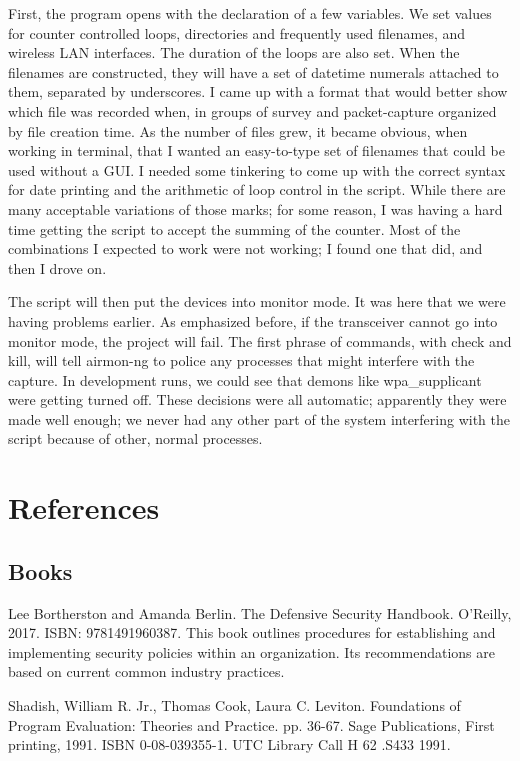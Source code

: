 First, the program opens with the declaration of a few variables.  We set values for counter controlled loops, directories and frequently used filenames, and wireless LAN interfaces.  The duration of the loops are also set.  When the filenames are constructed, they will have a set of datetime numerals attached to them, separated by underscores.  I came up with a format that would better show which file was recorded when, in groups of survey and packet-capture organized by file creation time.  As the number of files grew, it became obvious, when working in terminal, that I wanted an easy-to-type set of filenames that could be used without a GUI.  I needed some tinkering to come up with the correct syntax for date printing and the arithmetic of loop control in the script.  While there are many acceptable variations of those marks; for some reason, I was having a hard time getting the script to accept the summing of the counter.  Most of the combinations I expected to work were not working; I found one that did, and then I drove on.

The script will then put the devices into monitor mode.  It was here that we were having problems earlier.  As emphasized before, if the transceiver cannot go into monitor mode, the project will fail.  The first phrase of commands, with check and kill, will tell airmon-ng to police any processes that might interfere with the capture.  In development runs, we could see that demons like wpa\_supplicant were getting turned off.  These decisions were all automatic; apparently they were made well enough; we never had any other part of the system interfering with the script because of other, normal processes.


\section{References}

\subsection{Books}
Lee Bortherston and Amanda Berlin. The Defensive Security Handbook. O'Reilly, 2017. ISBN: 9781491960387. This book outlines procedures for establishing and implementing security policies within an organization. Its recommendations are based on current common industry practices.

Shadish, William R. Jr., Thomas Cook, Laura C. Leviton. Foundations of Program Evaluation: Theories and Practice. pp. 36-67. Sage Publications, First printing, 1991. ISBN 0-08-039355-1. UTC Library Call H 62 .S433 1991.


